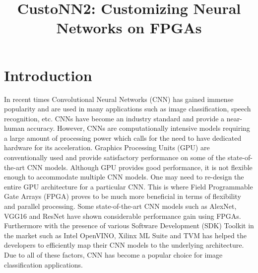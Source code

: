 \documentclass[titlepage]{report}
\title{\textbf{CustoNN2: Customizing Neural Networks on FPGAs}}
\begin{document}
\maketitle

\tableofcontents{}
\newpage

\chapter{Introduction}
In recent times Convolutional Neural Networks (CNN) has gained immense popularity and are used in many applications such as image classification, speech recognition, etc. CNNs have become an industry standard and provide a near-human accuracy. However, CNNs are computationally intensive models requiring a large amount of processing power which calls for the need to have dedicated
hardware for its acceleration. Graphics Processing Units (GPU) are conventionally used and provide satisfactory performance on some of the state-of-the-art CNN models. Although GPU provides good performance, it is not flexible enough to accommodate multiple CNN models. One may need to re-design the entire GPU architecture for a particular CNN. This is where Field Programmable
Gate Arrays (FPGA) proves to be much more beneficial in terms of flexibility
and parallel processing. Some state-of-the-art CNN models such as AlexNet,
VGG16 and ResNet have shown considerable performance gain using FPGAs.
Furthermore with the presence of various Software Development (SDK) Toolkit
in the market such as Intel OpenVINO, Xilinx ML Suite and TVM has helped
the developers to efficiently map their CNN models to the underlying architecture. Due to all of these factors, CNN has become a popular choice for image
classification applications.
\end{document}
